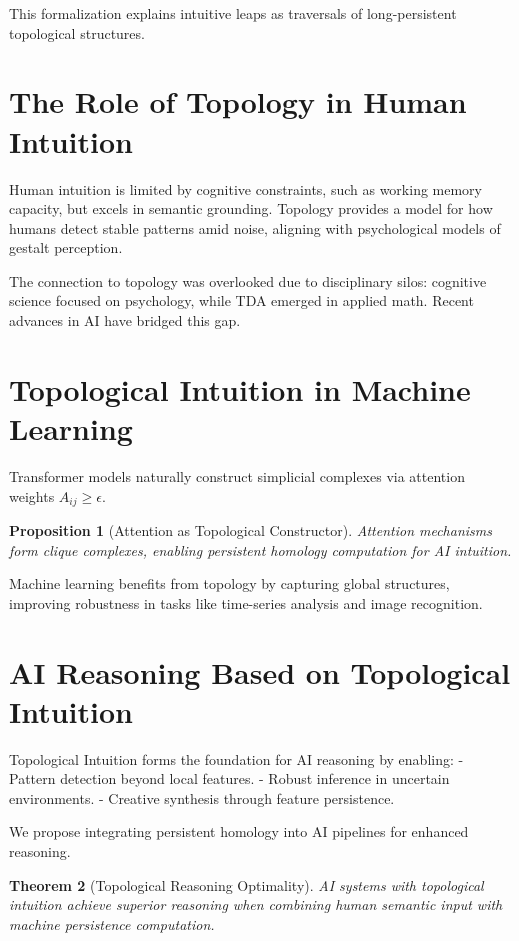 \documentclass[11pt]{article}
\newtheorem{theorem}{Theorem}[section]
\newtheorem{proposition}[theorem]{Proposition}
\begin{document}
This formalization explains intuitive leaps as traversals of long-persistent topological structures.

\section{The Role of Topology in Human Intuition}
Human intuition is limited by cognitive constraints, such as working memory capacity, but excels in semantic grounding. Topology provides a model for how humans detect stable patterns amid noise, aligning with psychological models of gestalt perception.

The connection to topology was overlooked due to disciplinary silos: cognitive science focused on psychology, while TDA emerged in applied math. Recent advances in AI have bridged this gap.

\section{Topological Intuition in Machine Learning}
Transformer models naturally construct simplicial complexes via attention weights $A_{ij} \geq \epsilon$.

\begin{proposition}[Attention as Topological Constructor]
Attention mechanisms form clique complexes, enabling persistent homology computation for AI intuition.
\end{proposition}

Machine learning benefits from topology by capturing global structures, improving robustness in tasks like time-series analysis and image recognition.

\section{AI Reasoning Based on Topological Intuition}
Topological Intuition forms the foundation for AI reasoning by enabling:
- Pattern detection beyond local features.
- Robust inference in uncertain environments.
- Creative synthesis through feature persistence.

We propose integrating persistent homology into AI pipelines for enhanced reasoning.

\begin{theorem}[Topological Reasoning Optimality]
AI systems with topological intuition achieve superior reasoning when combining human semantic input with machine persistence computation.
\end{theorem}
\end{document}
